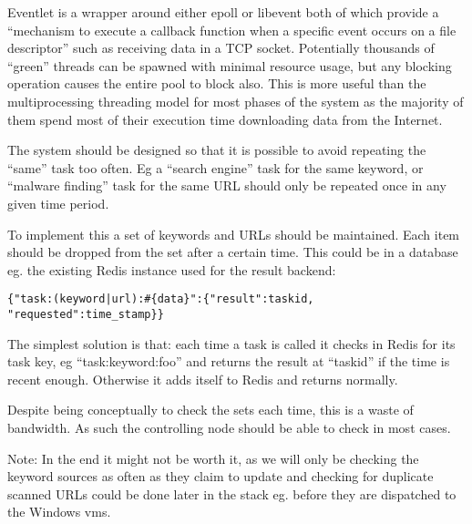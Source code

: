 Eventlet is a wrapper around either epoll or libevent both of which provide a ``mechanism to execute a callback function when a specific event occurs on a file descriptor'' such as receiving data in a TCP socket.  Potentially thousands of ``green'' threads can be spawned with minimal resource usage, but any blocking operation causes the entire pool to block also. This is more useful than the multiprocessing threading model for most phases of the system as the majority of them spend most of their execution time downloading data from the Internet.






The system should be designed so that it is possible to avoid repeating the ``same'' task too often. Eg a ``search engine'' task for the same keyword, or ``malware finding'' task for the same URL should only be repeated once in any given time period.

To implement this a set of keywords and URLs should be maintained. Each item should be dropped from the set after a certain time. This could be in a database eg. the existing Redis instance used for the result backend:

\verb/{"task:(keyword|url):#{data}":{"result":taskid, "requested":time_stamp}}/

The simplest solution is that: each time a task is called it checks in Redis for its task key, eg ``task:keyword:foo'' and returns the result at ``taskid'' if the time is recent enough. Otherwise it adds itself to Redis and returns normally.

Despite being conceptually to check the sets each time, this is a waste of bandwidth. As such the controlling node should be able to check in most cases.

Note: In the end it might not be worth it, as we will only be checking the keyword sources as often as they claim to update and checking for duplicate scanned URLs could be done later in the stack eg. before they are dispatched to the Windows vms.